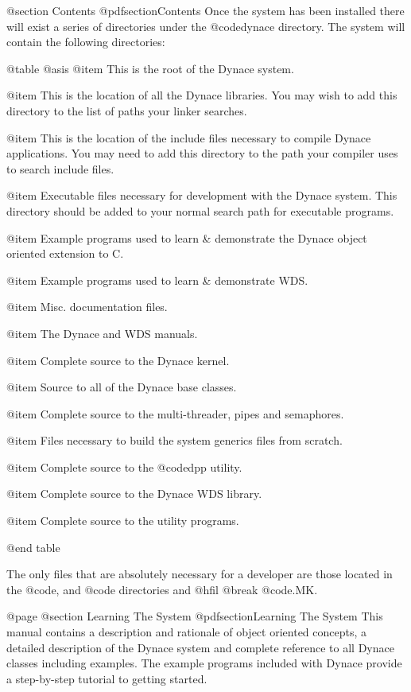 @section Contents
@pdfsection{Contents}
Once the system has been installed there will exist a series of
directories under the @code{dynace} directory.  The system will contain
the following directories:


@table @asis
@item \DYNACE
This is the root of the Dynace system.

@item \DYNACE\LIB
This is the location of all the Dynace libraries.  You may wish to add
this directory to the list of paths your linker searches.

@item \DYNACE\INCLUDE
This is the location of the include files necessary to compile Dynace
applications.  You may need to add this directory to the path your
compiler uses to search include files.

@item \DYNACE\BIN
Executable files necessary for development with the Dynace system.
This directory should be added to your normal search path for executable
programs.

@item \DYNACE\EXAMPLES
Example programs used to learn & demonstrate the Dynace object oriented
extension to C.

@item \DYNACE\WINEXAM
Example programs used to learn & demonstrate WDS.

@item \DYNACE\DOCS
Misc. documentation files.

@item \DYNACE\MANUAL
The Dynace and WDS manuals.

@item \DYNACE\KERNAL
Complete source to the Dynace kernel.

@item \DYNACE\CLASS
Source to all of the Dynace base classes.

@item \DYNACE\THREADS
Complete source to the multi-threader, pipes and semaphores.

@item \DYNACE\GENERICS
Files necessary to build the system generics files from scratch.

@item \DYNACE\DPP
Complete source to the @code{dpp} utility.

@item \DYNACE\WINDOWS
Complete source to the Dynace WDS library.

@item \DYNACE\UTILS
Complete source to the utility programs.

@end table



The only files that are absolutely necessary for a developer are those
located in the @code{\DYNACE\LIB, \DYNACE\INCLUDE} and @code{\DYNACE\BIN}
directories and @hfil @break @code{\DYNACE\UTILS\STARTUP.MK}.




@page
@section Learning The System
@pdfsection{Learning The System}
This manual contains a description and rationale of object oriented
concepts, a detailed description of the Dynace system and complete
reference to all Dynace classes including examples.  The example programs
included with Dynace provide a step-by-step tutorial to getting started.

